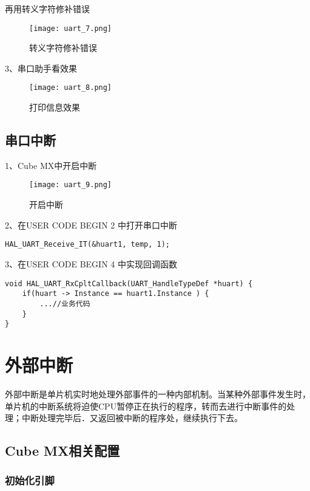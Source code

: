 \documentclass[cn,11pt]{elegantbook}
\begin{document}
再用转义字符修补错误

\begin{figure}[htbp]
	\centering
	\texttt{[image: uart\_7.png]}
	\caption{转义字符修补错误\label{fig:scatter}}
\end{figure}


3、串口助手看效果

\begin{figure}[htbp]
	\centering
	\texttt{[image: uart\_8.png]}
	\caption{打印信息效果\label{fig:scatter}}
\end{figure}

\subsection{串口中断}
1、Cube MX中开启中断
\begin{figure}[htbp]
	\centering
	\texttt{[image: uart\_9.png]}
	\caption{开启中断\label{fig:scatter}}
\end{figure}


2、在USER CODE BEGIN 2 中打开串口中断

\lstset{ language=C}
\begin{lstlisting}
HAL_UART_Receive_IT(&huart1, temp, 1);
\end{lstlisting}

3、在USER CODE BEGIN 4 中实现回调函数


\lstset{ language=C}
\begin{lstlisting}
void HAL_UART_RxCpltCallback(UART_HandleTypeDef *huart) {
	if(huart -> Instance == huart1.Instance ) {
		...//业务代码
	}
}
\end{lstlisting}


\section{外部中断}
外部中断是单片机实时地处理外部事件的一种内部机制。当某种外部事件发生时，单片机的中断系统将迫使CPU暂停正在执行的程序，转而去进行中断事件的处理；中断处理完毕后．又返回被中断的程序处，继续执行下去。
\subsection{Cube MX相关配置}

\subsubsection{初始化引脚}
\end{document}
